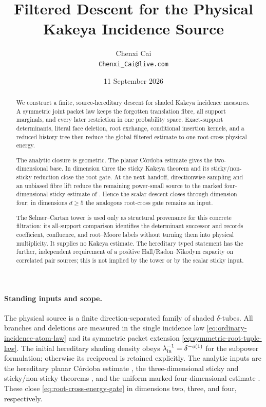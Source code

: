 \documentclass[11pt]{article}
\title{\textbf{Filtered Descent for the Physical Kakeya Incidence Source}}
\author{Chenxi Cai\\\texttt{Chenxi\_Cai@live.com}}
\date{11 September 2026}
\begin{document}
\setlength{\emergencystretch}{3em}
\allowdisplaybreaks
\maketitle

\begin{abstract}
We construct a finite, source-hereditary descent for shaded Kakeya incidence
measures.  A symmetric joint packet law keeps the forgotten translation fibre,
all support marginals, and every later restriction in one probability space.
Exact-support determinants, literal face deletion, root exchange, conditional
insertion kernels, and a reduced history tree then reduce the global filtered
estimate to one root-cross physical energy.

The analytic closure is geometric.  The planar C\'ordoba estimate
\cite{Cordoba77} gives the
two-dimensional base.  In dimension three the sticky Kakeya theorem and its
sticky/non-sticky reduction close the root gate.  At the next handoff,
directionwise sampling and an unbiased fibre lift reduce the remaining
power-small source to the marked four-dimensional sticky estimate of
\cite{StickyContact4D}.  Hence the scalar descent closes through dimension
four; in dimensions \(d\ge5\) the analogous root-cross gate remains an input.

The Selmer--Cartan tower \cite{UnifiedTower} is used only as structural
provenance for this concrete filtration: its all-support comparison identifies
the determinant successor and records coefficient, confluence, and
root--Moore labels without turning them into physical multiplicity.  It
supplies no Kakeya estimate.  The hereditary typed statement has the further,
independent requirement of a positive Hall/Radon--Nikodym capacity on
correlated pair sources; this is not implied by the tower or by the scalar
sticky input.
\end{abstract}

\paragraph{Standing inputs and scope.}
The physical source is a finite direction-separated family of shaded
\(\delta\)-tubes.  All branches and deletions are measured in the single
incidence law \eqref{eq:ordinary-incidence-atom-law} and its symmetric packet
extension \eqref{eq:symmetric-root-tuple-law}.  The initial hereditary shading
density obeys \(\lambda_{\rm in}^{-1}=\delta^{-o(1)}\) for the subpower
formulation; otherwise its reciprocal is retained explicitly.  The analytic
inputs are the hereditary planar C\'ordoba estimate \cite{Cordoba77}, the three-dimensional
sticky and sticky/non-sticky theorems
\cite{StickyKakeya,GuthWangZahl3D}, and the uniform marked
four-dimensional estimate \cite{StickyContact4D}.  These close
\eqref{eq:root-cross-energy-gate} in dimensions two, three, and four,
respectively.
\end{document}
